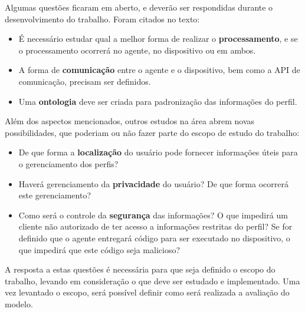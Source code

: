 \documentclass[a4paper, twocolumn]{article}
\begin{document}


Algumas questões ficaram em aberto, e deverão ser respondidas durante o desenvolvimento do trabalho. Foram citados no texto:

\begin{itemize}
  \item É necessário estudar qual a melhor forma de realizar o \textbf{processamento}, e se o processamento ocorrerá no agente, no dispositivo ou em ambos.
  \item A forma de \textbf{comunicação} entre o agente e o dispositivo, bem como a API de comunicação, precisam ser definidos.
  \item Uma \textbf{ontologia} deve ser criada para padronização das informações do perfil.
\end{itemize}

Além dos aspectos mencionados, outros estudos na área abrem novas possibilidades, que poderiam ou não fazer parte do escopo de estudo do trabalho:

\begin{itemize}

  \item De que forma a \textbf{localização} do usuário pode fornecer informações úteis para o gerenciamento dos perfis?

  \item Haverá gerenciamento da \textbf{privacidade} do usuário? De que forma ocorrerá este gerenciamento?

  \item Como será o controle da \textbf{segurança} das informações? O que impedirá um cliente não autorizado de ter acesso a informações restritas do perfil? Se for definido que o agente entregará código para ser executado no dispositivo, o que impedirá que este código seja malicioso?

\end{itemize}

A resposta a estas questões é necessária para que seja definido o escopo do trabalho, levando em consideração o que deve ser estudado e implementado. Uma vez levantado o escopo, será possível definir como será realizada a avaliação do modelo.




\begin{small}
  
\end{small}
\end{document}
